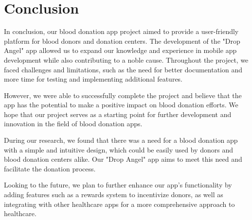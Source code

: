 

\chapter*{Conclusion}
\label{chp:conclusion}


In conclusion, our blood donation app project aimed to provide a user-friendly platform for blood donors and donation centers. The development of the "Drop Angel" app allowed us to expand our knowledge and experience in mobile app development while also contributing to a noble cause. Throughout the project, we faced challenges and limitations, such as the need for better documentation and more time for testing and implementing additional features.

However, we were able to successfully complete the project and believe that the app has the potential to make a positive impact on blood donation efforts. We hope that our project serves as a starting point for further development and innovation in the field of blood donation apps.


During our research, we found that there was a need for a blood donation app with a simple and intuitive design, which could be easily used by donors and blood donation centers alike. Our "Drop Angel" app aims to meet this need and facilitate the donation process.

Looking to the future, we plan to further enhance our app's functionality by adding features such as a rewards system to incentivize donors, as well as integrating with other healthcare apps for a more comprehensive approach to healthcare.